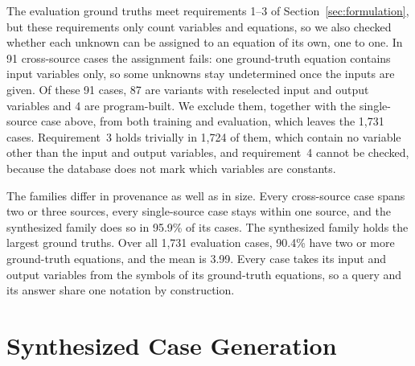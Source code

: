 The evaluation ground truths meet requirements 1--3 of Section~\ref{sec:formulation}, but these
requirements only count variables and equations, so we also checked whether each unknown can be
assigned to an equation of its own, one to one. In 91 cross-source cases the assignment fails: one
ground-truth equation contains input variables only, so some unknowns stay undetermined once the
inputs are given. Of these 91 cases, 87 are variants with reselected input and output variables and
4 are program-built. We exclude them, together with the single-source case above, from both
training and evaluation, which leaves the 1,731 cases. Requirement~3 holds trivially in 1,724 of
them, which contain no variable other than the
input and output variables, and requirement~4 cannot be checked, because the database does not mark
which variables are constants.

The families differ in provenance as well as in size. Every cross-source case spans two or three
sources, every single-source case stays within one source, and the synthesized family does so in
95.9\% of its cases. The synthesized family holds the largest ground truths. Over all 1,731
evaluation cases, 90.4\% have two or more ground-truth equations, and the mean is 3.99.
Every case takes its input and output variables from the symbols of its ground-truth equations, so
a query and its answer share one notation by construction.

\section{Synthesized Case Generation}
\label{sec:synth}

